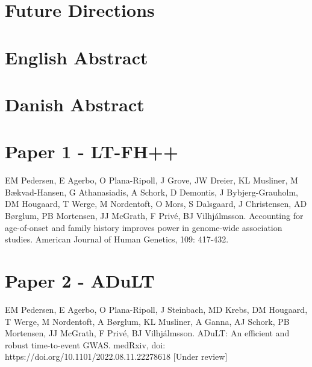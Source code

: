 \documentclass[a4paper, twoside]{report}
\begin{document}
\chapter{Future Directions}


\chapter{English Abstract}


\chapter{Danish Abstract}



\nocite{*}
\newpage
\printbibliography[heading=bibintoc,
title={References}]
\newpage



\begin{appendices}
\chapter{Paper 1 - LT-FH++}
\thispagestyle{empty}
EM Pedersen, E Agerbo, O Plana-Ripoll, J Grove, JW Dreier, KL Musliner, M Bækvad-Hansen, G Athanasiadis, A Schork, D Demontis, J Bybjerg-Grauholm, DM Hougaard, T Werge, M Nordentoft, O Mors, S Dalsgaard, J Christensen,  AD Børglum, PB Mortensen, JJ McGrath, F Privé, BJ Vilhjálmsson. Accounting for age-of-onset and family history improves power in genome-wide association studies. American Journal of Human Genetics, 109: 417-432.



\chapter{Paper 2 - ADuLT}
\thispagestyle{empty}
EM Pedersen, E Agerbo, O Plana-Ripoll, J Steinbach, MD Krebs, DM Hougaard, T Werge, M Nordentoft, A Børglum,  KL Musliner, A Ganna, AJ Schork, PB Mortensen,  JJ McGrath,  F Privé, BJ Vilhjálmsson. ADuLT: An efficient and robust time-to-event GWAS. medRxiv, doi: https://doi.org/10.1101/2022.08.11.22278618 [Under review]


%
%

\end{appendices}
\end{document}
